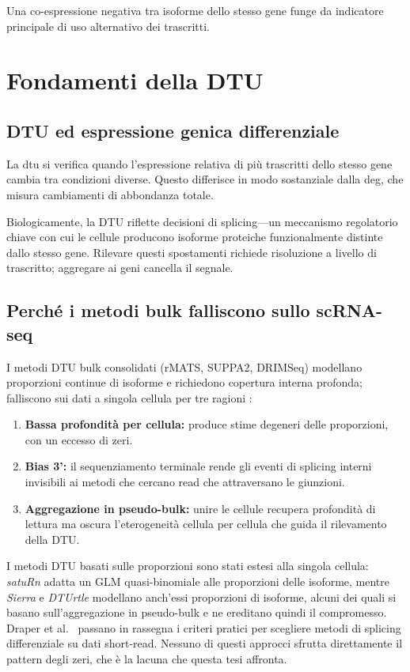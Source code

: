Una co-espressione negativa tra isoforme dello stesso gene funge da indicatore principale di uso alternativo dei trascritti.


\section{Fondamenti della DTU}

\subsection{DTU ed espressione genica differenziale}
La \gls{dtu} si verifica quando l'espressione relativa di più trascritti dello stesso gene cambia tra condizioni diverse. Questo differisce in modo sostanziale dalla \gls{deg}, che misura cambiamenti di abbondanza totale.

Biologicamente, la DTU riflette decisioni di \gls{splicing}---un meccanismo regolatorio chiave con cui le cellule producono isoforme proteiche funzionalmente distinte dallo stesso gene. Rilevare questi spostamenti richiede risoluzione a livello di trascritto; aggregare ai geni cancella il segnale.

\subsection{Perché i metodi bulk falliscono sullo scRNA-seq}
I metodi DTU bulk consolidati (rMATS, SUPPA2, DRIMSeq) modellano proporzioni continue di isoforme e richiedono copertura interna profonda; falliscono sui dati a singola cellula per tre ragioni \cite{galfre2021cotan, love2018swimming}:
\begin{enumerate}
    \item \textbf{Bassa profondità per cellula:} produce stime degeneri delle proporzioni, con un eccesso di zeri.
    \item \textbf{Bias 3':} il sequenziamento terminale rende gli eventi di splicing interni invisibili ai metodi che cercano read che attraversano le giunzioni.
    \item \textbf{Aggregazione in pseudo-bulk:} unire le cellule recupera profondità di lettura ma oscura l'eterogeneità cellula per cellula che guida il rilevamento della DTU.
\end{enumerate}

I metodi DTU basati sulle proporzioni sono stati estesi alla singola cellula: \textit{satuRn} \cite{gilis2021satuRn} adatta un GLM quasi-binomiale alle proporzioni delle isoforme, mentre \textit{Sierra} \cite{patrick2020sierra} e \textit{DTUrtle} \cite{tekath2021dturtle} modellano anch'essi proporzioni di isoforme, alcuni dei quali si basano sull'aggregazione in pseudo-bulk e ne ereditano quindi il compromesso. Draper et al.\ \cite{draper2025selecting} passano in rassegna i criteri pratici per scegliere metodi di splicing differenziale su dati short-read. Nessuno di questi approcci sfrutta direttamente il pattern degli zeri, che è la lacuna che questa tesi affronta.

